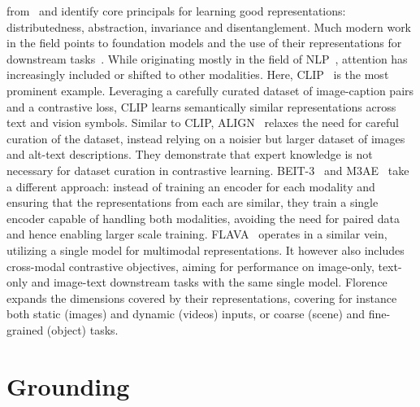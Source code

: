 \documentclass[../main.tex]{subfiles}
\begin{document}
from~\citet{bengio_representation_2013} and identify core principals for learning good
representations: distributedness, abstraction, invariance and disentanglement. Much modern work in
the field points to foundation models and the use of their representations for downstream tasks~\citep{bommasani_opportunities_2021, zhou_comprehensive_2023}. While originating mostly in the field
of NLP~\citep{devlin_bert_2019, brown_language_2020, touvron_llama_2023}, attention has increasingly
included or shifted to other modalities. Here, CLIP~\citep{radford_learning_2021} is the most
prominent example. Leveraging a carefully curated dataset of image-caption pairs and a contrastive
loss, CLIP learns semantically similar representations across text and vision symbols. Similar to
CLIP, ALIGN~\citep{jia_scaling_2021} relaxes the need for careful curation of the dataset,
instead relying on a noisier but larger dataset of images and alt-text descriptions. They
demonstrate that expert knowledge is not necessary for dataset curation in contrastive learning.
BEIT-3~\citep{wang_image_2022} and M3AE~\citep{geng_multimodal_2022} take a different approach:
instead of training an encoder for each modality and ensuring that the representations from each are
similar, they train a single encoder capable of handling both modalities, avoiding the need for
paired data and hence enabling larger scale training. FLAVA~\citep{singh_flava_2022} operates in
a similar vein, utilizing a single model for multimodal representations. It however also includes
cross-modal contrastive objectives, aiming for performance on image-only, text-only and image-text
downstream tasks with the same single model. Florence~\citep{yuan_florence_2021} expands the
dimensions covered by their representations, covering for instance both static (images) and dynamic
(videos) inputs, or coarse (scene) and fine-grained (object) tasks.

\section{Grounding}
\end{document}
